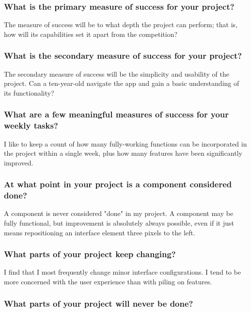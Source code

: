 \documentclass[letterpaper]{article}            %
\begin{document}
\subsubsection{What is the primary measure of success for your project?}

The measure of success will be to what depth the project can perform; that is, how will its capabilities set it apart from the competition?

\subsubsection{What is the secondary measure of success for your project?}

The secondary measure of success will be the simplicity and usability of the project. Can a ten-year-old navigate the app and gain a basic understanding of its functionality?

\subsubsection{What are a few meaningful measures of success for your weekly tasks?}

I like to keep a count of how many fully-working functions can be incorporated in the project within a single week, plus how many features have been significantly improved.

\subsubsection{At what point in your project is a component considered done?}

A component is never considered "done" in my project. A component may be fully functional, but improvement is absolutely always possible, even if it just means repositioning an interface element three pixels to the left.

\subsubsection{What parts of your project keep changing?}

I find that I most frequently change minor interface configurations. I tend to be more concerned with the user experience than with piling on features.

\subsubsection{What parts of your project will never be done?}
\end{document}
